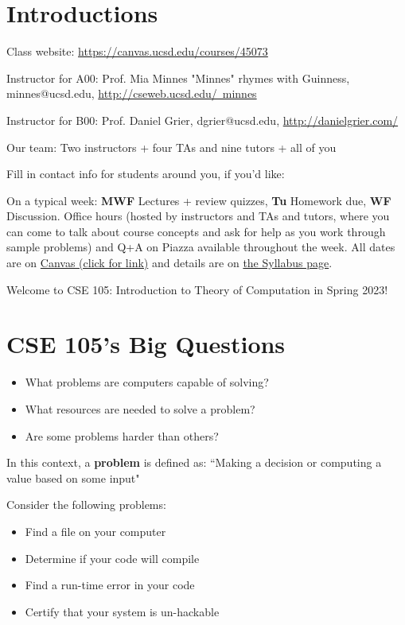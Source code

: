 \documentclass[12pt, oneside]{article}
\begin{document}
\newpage

\section*{Introductions}
Class website: \href{https://canvas.ucsd.edu/courses/45073}{https://canvas.ucsd.edu/courses/45073}


Instructor for A00: Prof. Mia Minnes {\tiny{"Minnes" rhymes with Guinness}}, minnes@ucsd.edu, 
\href{http://cseweb.ucsd.edu/~minnes}{http://cseweb.ucsd.edu/~minnes}

Instructor for B00: Prof. Daniel Grier, dgrier@ucsd.edu, \href{http://danielgrier.com/}{http://danielgrier.com/}

Our team: Two instructors + four TAs and nine tutors + all of you

Fill in contact info for students around you, if you'd like:

\vfill


On a typical week: {\bf MWF} Lectures + review quizzes, {\bf Tu} Homework due, {\bf WF} Discussion.
Office hours (hosted by instructors and TAs and tutors, where you can come to talk 
about course concepts and ask for help as you work through sample problems) and Q+A on Piazza available throughout the week.
All dates are on \href{https://canvas.ucsd.edu/}{Canvas (click for link)} and details are on
 \href{https://canvas.ucsd.edu/courses/45073}{the Syllabus page}.

\newpage Welcome to CSE 105: Introduction to Theory of Computation in Spring 2023!

\section*{CSE 105's Big Questions}
\begin{itemize}
   \item What problems are computers capable of solving?
   \item What resources are needed to solve a problem?
   \item Are some problems harder than others?
\end{itemize}

In this context, a {\bf problem} is defined as: ``Making a decision or computing a value based on some input"

Consider the following problems: 
\begin{itemize}
   \item Find a file on your computer
   \item Determine if your code will compile
   \item Find a run-time error in your code
   \item Certify that your system is un-hackable
\end{itemize}
\end{document}
